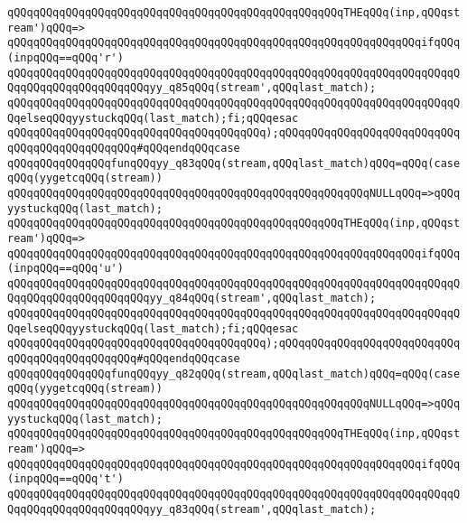 \verb|qQQqqQQqqQQqqQQqqQQqqQQqqQQqqQQqqQQqqQQqqQQqqQQqqQQqTHEqQQq(inp,qQQqstream')qQQq=>|\newline
\verb|qQQqqQQqqQQqqQQqqQQqqQQqqQQqqQQqqQQqqQQqqQQqqQQqqQQqqQQqqQQqqQQqifqQQq(inpqQQq==qQQq'r')|\newline
\verb|qQQqqQQqqQQqqQQqqQQqqQQqqQQqqQQqqQQqqQQqqQQqqQQqqQQqqQQqqQQqqQQqqQQqqQQqqQQqqQQqqQQqqQQqqQQqyy_q85qQQq(stream',qQQqlast_match);|\newline
\verb|qQQqqQQqqQQqqQQqqQQqqQQqqQQqqQQqqQQqqQQqqQQqqQQqqQQqqQQqqQQqqQQqqQQqqQQqelseqQQqyystuckqQQq(last_match);fi;qQQqesac|\newline
\verb|qQQqqQQqqQQqqQQqqQQqqQQqqQQqqQQqqQQqqQQq);qQQqqQQqqQQqqQQqqQQqqQQqqQQqqQQqqQQqqQQqqQQqqQQq#qQQqendqQQqcase|\newline
\verb|qQQqqQQqqQQqqQQqfunqQQqyy_q83qQQq(stream,qQQqlast_match)qQQq=qQQq(caseqQQq(yygetcqQQq(stream))|\newline
\verb|qQQqqQQqqQQqqQQqqQQqqQQqqQQqqQQqqQQqqQQqqQQqqQQqqQQqqQQqNULLqQQq=>qQQqyystuckqQQq(last_match);|\newline
\verb|qQQqqQQqqQQqqQQqqQQqqQQqqQQqqQQqqQQqqQQqqQQqqQQqqQQqTHEqQQq(inp,qQQqstream')qQQq=>|\newline
\verb|qQQqqQQqqQQqqQQqqQQqqQQqqQQqqQQqqQQqqQQqqQQqqQQqqQQqqQQqqQQqqQQqifqQQq(inpqQQq==qQQq'u')|\newline
\verb|qQQqqQQqqQQqqQQqqQQqqQQqqQQqqQQqqQQqqQQqqQQqqQQqqQQqqQQqqQQqqQQqqQQqqQQqqQQqqQQqqQQqqQQqqQQqyy_q84qQQq(stream',qQQqlast_match);|\newline
\verb|qQQqqQQqqQQqqQQqqQQqqQQqqQQqqQQqqQQqqQQqqQQqqQQqqQQqqQQqqQQqqQQqqQQqqQQqelseqQQqyystuckqQQq(last_match);fi;qQQqesac|\newline
\verb|qQQqqQQqqQQqqQQqqQQqqQQqqQQqqQQqqQQqqQQq);qQQqqQQqqQQqqQQqqQQqqQQqqQQqqQQqqQQqqQQqqQQqqQQq#qQQqendqQQqcase|\newline
\verb|qQQqqQQqqQQqqQQqfunqQQqyy_q82qQQq(stream,qQQqlast_match)qQQq=qQQq(caseqQQq(yygetcqQQq(stream))|\newline
\verb|qQQqqQQqqQQqqQQqqQQqqQQqqQQqqQQqqQQqqQQqqQQqqQQqqQQqqQQqNULLqQQq=>qQQqyystuckqQQq(last_match);|\newline
\verb|qQQqqQQqqQQqqQQqqQQqqQQqqQQqqQQqqQQqqQQqqQQqqQQqqQQqTHEqQQq(inp,qQQqstream')qQQq=>|\newline
\verb|qQQqqQQqqQQqqQQqqQQqqQQqqQQqqQQqqQQqqQQqqQQqqQQqqQQqqQQqqQQqqQQqifqQQq(inpqQQq==qQQq't')|\newline
\verb|qQQqqQQqqQQqqQQqqQQqqQQqqQQqqQQqqQQqqQQqqQQqqQQqqQQqqQQqqQQqqQQqqQQqqQQqqQQqqQQqqQQqqQQqqQQqyy_q83qQQq(stream',qQQqlast_match);|\newline

